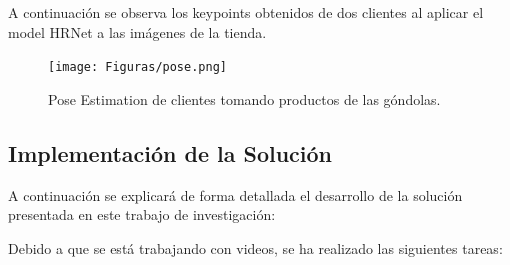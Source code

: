 \documentclass[conference]{IEEEtran}
\begin{document}
A continuación se observa los keypoints obtenidos de dos clientes al aplicar el model HRNet a las imágenes de la tienda.

\begin{figure}[hbtp]
\centering
\texttt{[image: Figuras/pose.png]}
\caption{Pose Estimation de clientes tomando productos de las góndolas.}
\label{fig:pose}
\end{figure}

\subsection{Implementación de la Solución}
A continuación se explicará de forma detallada el desarrollo de la solución presentada en este trabajo de investigación:

Debido a que se está trabajando con videos, se ha realizado las siguientes tareas:
\\
\end{document}
